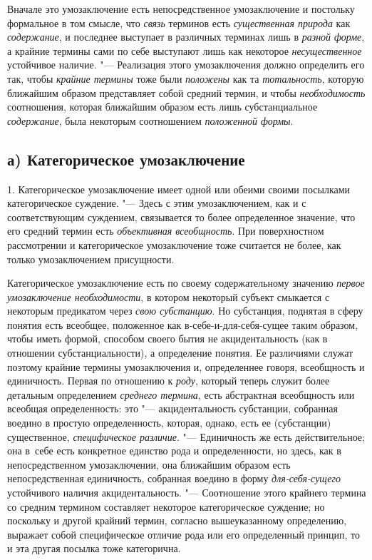 Вначале это умозаключение есть непосредственное умозаключение
и постольку формальное в том смысле, что
{\em связь} терминов есть
{\em существенная природа}
как {\em содержание},
и последнее выступает в различных терминах лишь в
{\em разной форме}, а
крайние термины сами по себе выступают лишь как некоторое
{\em несущественное}
устойчивое наличие. "--- Реализация этого
умозаключения должно определить его так, чтобы
{\em крайние термины
}тоже были
{\em положены} как та
{\em тотальность},
которую ближайшим образом представляет собой средний термин,
и чтобы {\em необходимость}
соотношения, которая ближайшим образом есть лишь
субстанциальное {\em содержание},
была некоторым соотношением
{\em положенной формы}.

\subsection[а) Категорическое умозаключение]{а) Категорическое умозаключение}
1. Категорическое умозаключение имеет одной или обеими своими
посылками категорическое
суждение.
"--- Здесь с этим умозаключением, как и с соответствующим
суждением, связывается то более определенное значение, что
его средний термин есть {\em объективная
всеобщность}. При поверхностном рассмотрении и
категорическое умозаключение тоже считается не более, как только
умозаключением присущности.

Категорическое умозаключение есть по своему содержательному
значению {\em первое умозаключение
необходимости}, в котором некоторый субъект смыкается с
некоторым предикатом через {\em свою
субстанцию}. Но субстанция, поднятая в сферу понятия есть
всеобщее, положенное как в-себе-и-для-себя-сущее таким образом, чтобы иметь
формой, способом своего бытия не акцидентальность (как в отношении
субстанциальности), а определение понятия. Ее различиями служат поэтому
крайние термины умозаключения и, определеннее говоря, всеобщность и
единичность. Первая по отношению к
{\em роду}, который
теперь служит более детальным определением
{\em среднего термина},
есть абстрактная всеобщность или всеобщая определенность:
это "--- акцидентальность субстанции, собранная воедино в
простую определенность, которая, однако, есть ее (субстанции) существенное,
{\em специфическое различие}. "---
Единичность же есть действительное; она в~себе есть
конкретное единство рода и определенности, но здесь, как в непосредственном
умозаключении, она ближайшим образом есть непосредственная единичность,
собранная воедино в форму
{\em для-себя-сущего}
устойчивого наличия акцидентальность. "---
Соотношение этого крайнего термина со средним термином
составляет некоторое категорическое суждение; но поскольку и другой крайний
термин, согласно вышеуказанному определению, выражает собой специфическое
отличие рода или его определенный принцип, то и эта другая посылка тоже
категорична.


